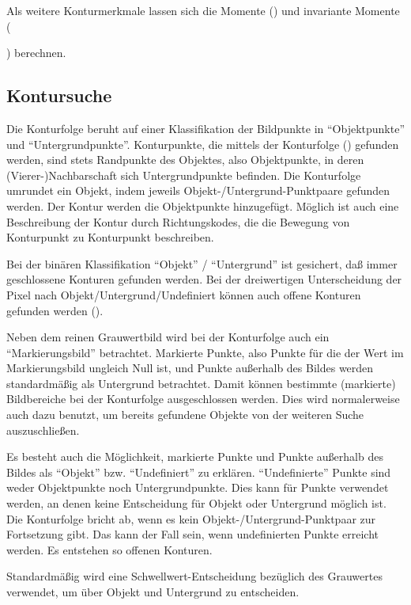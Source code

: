 Als weitere Konturmerkmale lassen sich die Momente () und
invariante Momente ({) berechnen.

\subsection{Kontursuche}

Die Konturfolge beruht auf einer Klassifikation der
Bildpunkte in ``Objektpunkte'' und ``Untergrundpunkte''. 
Konturpunkte, die mittels der Konturfolge () gefunden 
werden, sind stets Randpunkte des Objektes, also Objektpunkte, in 
deren (Vierer-)Nachbarschaft sich
Untergrundpunkte befinden. Die Konturfolge umrundet ein Objekt, indem
jeweils Objekt-/Untergrund-Punktpaare gefunden werden. Der Kontur 
werden die Objektpunkte hinzugefügt. Möglich ist auch eine Beschreibung der
Kontur durch Richtungskodes, die die Bewegung von Konturpunkt zu Konturpunkt
beschreiben.

Bei der binären Klassifikation ``Objekt'' / ``Untergrund''
ist gesichert, daß immer geschlossene Konturen gefunden werden.
Bei der dreiwertigen Unterscheidung der Pixel nach Objekt/Untergrund/Undefiniert
können auch offene Konturen gefunden werden (). 

Neben dem reinen Grauwertbild wird bei der Konturfolge auch ein
``Markierungsbild'' betrachtet. Markierte Punkte, also Punkte für die
der Wert im Markierungsbild ungleich Null ist, und Punkte außerhalb 
des Bildes werden standardmäßig als Untergrund betrachtet. Damit
können bestimmte (markierte) Bildbereiche bei der Konturfolge 
ausgeschlossen werden. Dies wird normalerweise auch dazu benutzt, 
um bereits gefundene Objekte von der weiteren Suche auszuschließen.

Es besteht auch die Möglichkeit, markierte Punkte und Punkte außerhalb 
des Bildes als ``Objekt'' bzw. ``Undefiniert'' zu erklären.
``Undefinierte'' Punkte sind weder Objektpunkte noch Untergrundpunkte. Dies
kann für Punkte verwendet werden, an denen keine Entscheidung für Objekt oder
Untergrund möglich ist. Die Konturfolge bricht ab, wenn es kein 
Objekt-/Untergrund-Punktpaar zur Fortsetzung gibt. Das kann der Fall 
sein, wenn undefinierten Punkte erreicht werden. Es entstehen so
offenen Konturen.

Standardmäßig wird eine Schwellwert-Entscheidung bezüglich des Grauwertes
verwendet, um über Objekt und Untergrund zu entscheiden.

}
